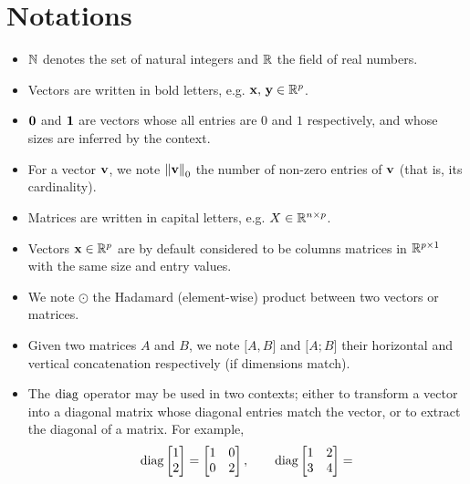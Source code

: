 \cleardoublepage
\chapter*{Notations}

\begin{itemize}
    \item $\mathbb{N}$ denotes the set of natural integers and $\mathbb{R}$ the field of real numbers.
    \item Vectors are written in bold letters, e.g. $\mathbf{x},\, \mathbf{y} \in \mathbb{R}^p$.
    \item $\mathbf{0}$ and $\mathbf{1}$ are vectors whose all entries are $0$ and $1$ respectively,
        and whose sizes are inferred by the context.
    \item For a vector $\mathbf{v}$, we note $\left\lVert\mathbf{v}\right\rVert_0$ the number of non-zero entries of $\mathbf{v}$ (that is, its cardinality).
    \item Matrices are written in capital letters, e.g. $X \in \mathbb{R}^{n \times p}$.
    \item Vectors $\mathbf{x} \in \mathbb{R}^p$ are by default considered to be columns matrices in
        $\mathbb{R}^{p \times 1}$ with the same size and entry values.
    \item We note $\odot$ the Hadamard (element-wise) product between two vectors or matrices.
    \item Given two matrices $A$ and $B$, we note $\big[ A, B \big]$ and $\big[ A; B \big]$ their horizontal and
        vertical concatenation respectively (if dimensions match).
    \item The $\operatorname*{diag}$ operator may be used in two contexts;
    either to transform a vector into a diagonal matrix whose diagonal entries match the vector,
    or to extract the diagonal of a matrix.
    For example,
    \begin{equation*}
        \diag \begin{bmatrix}
                  1\\
                  2
        \end{bmatrix}
        =
        \begin{bmatrix}
            1 & 0\\
            0 & 2
        \end{bmatrix}
        ,\qquad
        \diag \begin{bmatrix}
                  1 & 2\\
                  3 & 4
        \end{bmatrix}
        =

\end{equation*}
\end{itemize}
